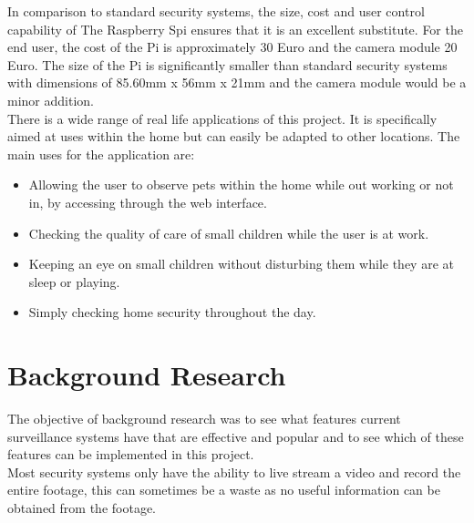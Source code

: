 \documentclass[12pt]{report}
\begin{document}
In comparison to standard security systems, the size, cost and user control capability of The Raspberry Spi ensures that it is an excellent substitute. For the end user, the cost of the Pi is approximately 30 Euro and the camera module 20 Euro. The size of the Pi is significantly smaller than standard security systems with dimensions of 85.60mm x 56mm x 21mm and the camera module would be a minor addition.\\

There is a wide range of real life applications of this project. It is specifically aimed at uses within the home but can easily be adapted to other locations. The main uses for the application are: \\

\begin{itemize}

   \item Allowing the user to observe pets within the home while out working or not in, by accessing through the web interface.\\  
  
  \item Checking the quality of care of small children while the user is at work.\\
  
  \item Keeping an eye on small children without disturbing them while they are at sleep or playing.\\ 
  
  \item Simply checking home security throughout the day.\\  
  
\end{itemize}

\section{Background Research}
\label{sec:research}

The objective of background research was to see what features current surveillance systems have that are effective and popular and to see which of these features can be implemented in this project.\\

Most security systems only have the ability to live stream a video and record the entire footage, this can sometimes be a waste as no useful information can be obtained from the footage.\\ 
\end{document}

